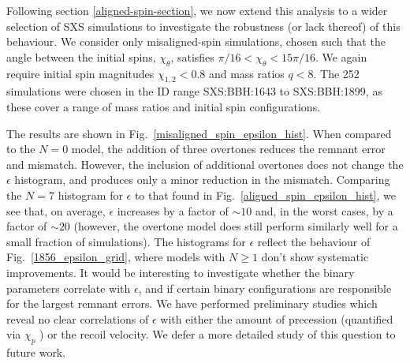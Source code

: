 Following section \ref{aligned-spin-section}, we now extend this analysis to a wider selection of SXS simulations to investigate the robustness (or lack thereof) of this behaviour. We consider only misaligned-spin simulations, chosen such that the angle between the initial spins, $\chi_{\theta}$, satisfies $\pi/16 < \chi_{\theta} < 15\pi/16$. We again require initial spin magnitudes $\chi_{1,2} < 0.8$ and mass ratios $q<8$. The 252 simulations were chosen in the ID range SXS:BBH:1643 to SXS:BBH:1899, as these cover a range of mass ratios and initial spin configurations.

The results are shown in Fig.~\ref{misaligned_spin_epsilon_hist}. 
When compared to the $N=0$ model, the addition of three overtones reduces the remnant error and mismatch. 
However, the inclusion of additional overtones does not change the $\epsilon$ histogram, and produces only a minor reduction in the mismatch.
Comparing the $N=7$ histogram for $\epsilon$ to that found in Fig.~\ref{aligned_spin_epsilon_hist}, we see that, on average, $\epsilon$ increases by a factor of $\sim 10$ and, in the worst cases, by a factor of $\sim 20$ (however, the overtone model does still perform similarly well for a small fraction of simulations). 
The histograms for $\epsilon$ reflect the behaviour of Fig.~\ref{1856_epsilon_grid}, where models with $N \geq 1$ don't show systematic improvements. 
It would be interesting to investigate whether the binary parameters correlate with $\epsilon$, and if certain binary configurations are responsible for the largest remnant errors. We have performed preliminary studies which reveal no clear correlations of $\epsilon$ with either the amount of precession (quantified via $\chi_p$ \cite{Schmidt:2014iyl}) or the recoil velocity. We defer a more detailed study of this question to future work.


